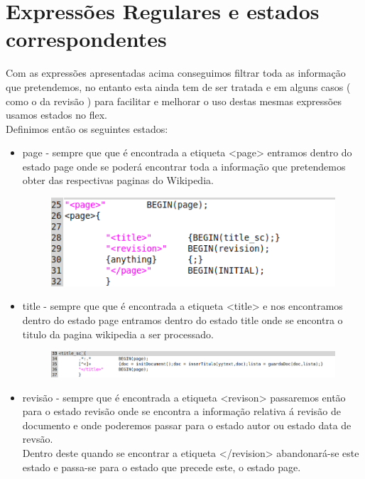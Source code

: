 \documentclass[a4paper,11pt,openright,openbib]{report}
\begin{document}
\section{Expressões Regulares e estados correspondentes}
Com as expressões apresentadas acima conseguimos filtrar toda as informação que pretendemos, no entanto esta ainda tem de ser tratada e em alguns casos ( como o da revisão ) para facilitar e melhorar o uso destas mesmas expressões usamos estados no flex.\\
Definimos então os seguintes estados:
\begin{itemize}
	\item page - sempre que que é encontrada a etiqueta <page> entramos dentro do estado page onde se poderá encontrar toda a informação que pretendemos obter das respectivas paginas do Wikipedia.
	\begin{figure}[!htb]
		\centering
		\includegraphics[scale=0.5]{imagens/page.png}
	\end{figure}  
	\item title - sempre que que é encontrada a etiqueta <title> e nos encontramos dentro do estado page entramos dentro do estado title onde se encontra o titulo da pagina wikipedia a ser processado.\\
	\begin{figure}[!htb]
		\centering
		\includegraphics[scale=0.5]{imagens/title.png}
	\end{figure}
	\item revisão - sempre que é encontrada a etiqueta <revison> passaremos então para o estado revisão onde se encontra a informação relativa á revisão de documento e onde poderemos passar para o estado autor ou estado data de revsão.\\
	Dentro deste quando se encontrar a etiqueta </revision> abandonará-se este estado e passa-se para o estado que precede este, o estado page.\\
	\begin{figure}[!htb]

\end{figure}
\end{itemize}
\end{document}
